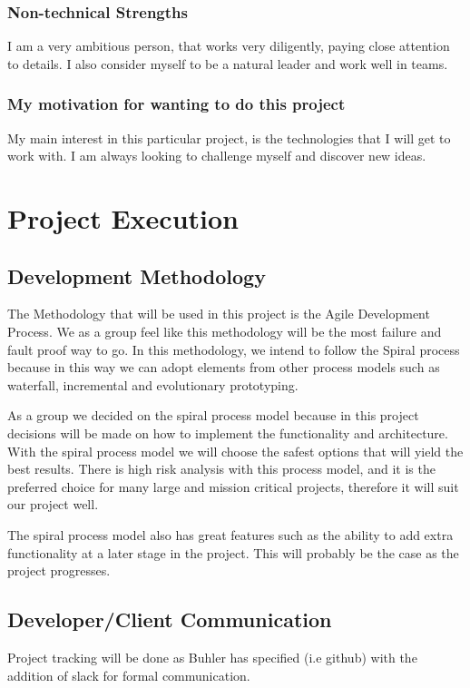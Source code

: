 \documentclass[a4paper,12pt]{article}
\begin{document}
			\subsubsection{Non-technical Strengths}
			I am a very ambitious person, that works very diligently, paying close attention to details. I also consider myself to be a natural leader and work well in teams. 
			\subsubsection{My motivation for wanting to do this project}
			My main interest in this particular project, is the technologies that I will get to work with. I am always looking to challenge myself and discover new ideas.
	\newpage
	\section{Project Execution}
	
	\subsection{Development Methodology}  
	
	The Methodology that will be used in this project is the Agile Development Process. We as a group feel like this methodology will be the most failure and fault proof way to go. In this methodology, we intend to follow the Spiral process because in this way we can adopt elements from other process models such as waterfall, incremental and evolutionary prototyping.

	{\noindent}As a group we decided on the spiral process model because in this project decisions will be made on how to implement the functionality and architecture. With the spiral process model we will choose the safest options that will yield the best results. There is high risk analysis with this process model, and it is the preferred choice for many large and mission critical projects, therefore it will suit our project well.

	{\noindent}The spiral process model also has great features such as the ability to add extra functionality at a later stage in the project. This will probably be the case as the project progresses.

	
	\newpage
	\subsection{Developer/Client Communication}
		Project tracking will be done as Buhler has specified (i.e github) with the addition of slack for formal communication. 
	
\end{document}
